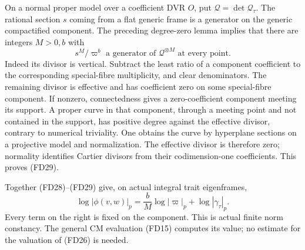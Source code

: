 On a normal proper model over a coefficient DVR \(O\),
put \(\mathscr Q=\det\mathcal Q_\tau\).
The rational section \(s\) coming from a flat generic frame
is a generator on the generic compactified component.
The preceding degree-zero lemma implies that there are
integers \(M>0,b\) with
\[
                          s^M/\varpi^b
               \text{ a generator of }\mathscr Q^{\otimes M}
                                  \text{ at every point}.
 \tag{FD29}
\]
Indeed its divisor is vertical.
Subtract the least ratio of a component coefficient to the
corresponding special-fibre multiplicity, and clear denominators.
The remaining divisor is effective and has coefficient zero
on some special-fibre component.
If nonzero, connectedness gives a zero-coefficient component
meeting its support.  A proper curve in that component,
through a meeting point and not contained in the support,
has positive degree against the effective divisor, contrary
to numerical triviality.
One obtains the curve by hyperplane sections on a projective
model and normalization.
The effective divisor is therefore zero; normality identifies
Cartier divisors from their codimension-one coefficients.
This proves (FD29).

Together (FD28)--(FD29) give, on actual integral trait eigenframes,
\[
              \log|\phi(v,w)|_p
                       =\frac bM\log|\varpi|_p+\log|\gamma_\tau|_p .
 \tag{FD30}
\]
Every term on the right is fixed on the component.
This is actual finite norm constancy.
The general CM evaluation (FD15) computes its value;
no estimate for the valuation of (FD26) is needed.

